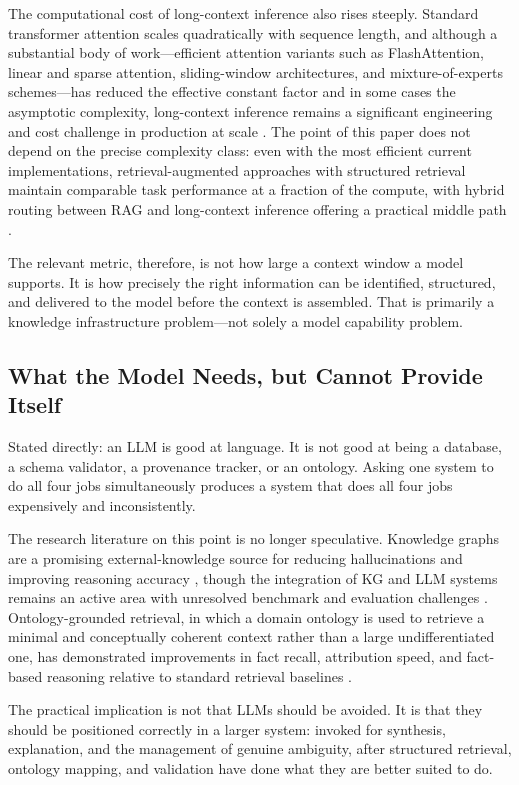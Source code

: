 \documentclass[man,12pt,donotrepeattitle]{apa7}
\begin{document}
The computational cost of long-context inference also rises steeply.
Standard transformer attention scales quadratically with sequence length,
and although a substantial body of work---efficient attention variants such
as FlashAttention, linear and sparse attention, sliding-window
architectures, and mixture-of-experts schemes---has reduced the effective
constant factor and in some cases the asymptotic complexity, long-context
inference remains a significant engineering and cost challenge in production
at scale \parencite{tay2022,dao2022}. The point of this paper does not
depend on the precise complexity class: even with the most efficient current
implementations, retrieval-augmented approaches with structured retrieval
maintain comparable task performance at a fraction of the compute, with
hybrid routing between RAG and long-context inference offering a practical
middle path \parencite{li2024}.

The relevant metric, therefore, is not how large a context window a model
supports. It is how precisely the right information can be identified,
structured, and delivered to the model before the context is assembled. That
is primarily a knowledge infrastructure problem---not solely a model
capability problem.

\subsection{What the Model Needs, but Cannot Provide Itself}

Stated directly: an LLM is good at language. It is not good at being a
database, a schema validator, a provenance tracker, or an ontology. Asking
one system to do all four jobs simultaneously produces a system that does
all four jobs expensively and inconsistently.

The research literature on this point is no longer speculative. Knowledge
graphs are a promising external-knowledge source for reducing hallucinations
and improving reasoning accuracy \parencite{agrawal2024}, though the
integration of KG and LLM systems remains an active area with unresolved
benchmark and evaluation challenges \parencite{lavrinovics2024}.
Ontology-grounded retrieval, in which a domain ontology is used to retrieve
a minimal and conceptually coherent context rather than a large
undifferentiated one, has demonstrated improvements in fact recall,
attribution speed, and fact-based reasoning relative to standard retrieval
baselines \parencite{sharma2024}.

The practical implication is not that LLMs should be avoided. It is that
they should be positioned correctly in a larger system: invoked for
synthesis, explanation, and the management of genuine ambiguity, after
structured retrieval, ontology mapping, and validation have done what they
are better suited to do.
\end{document}
